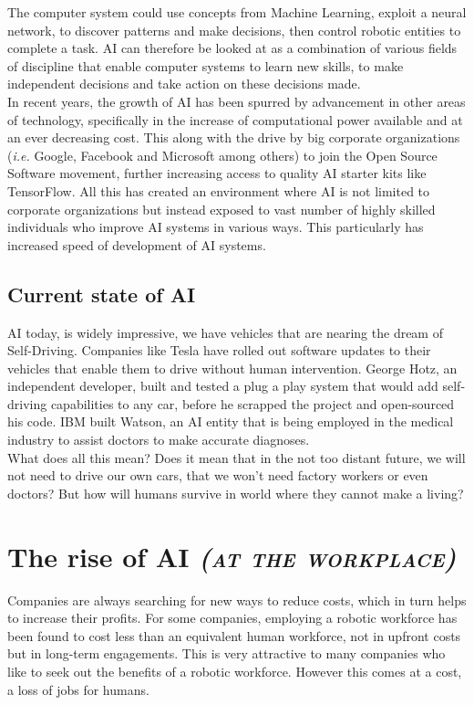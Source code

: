 \documentclass[12pt, a4paper]{report}
\begin{document}
The computer system could use concepts from Machine Learning, exploit a neural network,
to discover patterns and make decisions, then control robotic entities to complete a task.
AI can therefore be looked at as a combination of various fields of discipline
that enable computer systems to learn new skills, to make independent decisions and take action
on these decisions made.\\

In recent years, the growth of AI has been spurred by advancement in other areas of
technology, specifically in the increase of computational power available and at an ever decreasing
cost. This along with the drive by big corporate organizations (\emph{i.e.} Google, Facebook and
Microsoft among others) to join the Open Source Software movement, further increasing access to
quality AI starter kits like TensorFlow. All this has created an environment where
AI is not limited to corporate organizations but instead exposed to vast number of highly skilled
individuals who improve AI systems in various ways. This particularly has increased speed
of development of AI systems.\\

\subsection*{Current state of AI}
AI today, is widely impressive, we have vehicles that are nearing the
dream of Self-Driving. Companies like Tesla have rolled out software updates to their vehicles
that enable them to drive without human intervention. George Hotz, an
independent developer, built and tested a plug a play system that would add self-driving capabilities
to any car, before he scrapped the project and open-sourced his code. IBM built Watson, an AI
entity that is being employed in the medical industry to assist doctors to make accurate diagnoses.\\

What does all this mean? Does it mean that in the not too distant future, we will not need
to drive our own cars, that we won't need factory workers or even doctors?
But how will humans survive in world where they cannot make a living?

\newpage
\section*{The rise of AI \emph{\textsc{(at the workplace)}}}
Companies are always searching for new ways to reduce costs, which in turn helps
to increase their profits. For some companies, employing a robotic workforce has
been found to cost less than an equivalent human workforce, not in upfront costs
but in long-term engagements. This is very attractive to many companies who like
to seek out the benefits of a robotic workforce. However this comes at a cost,
a loss of jobs for humans.\\
\end{document}
